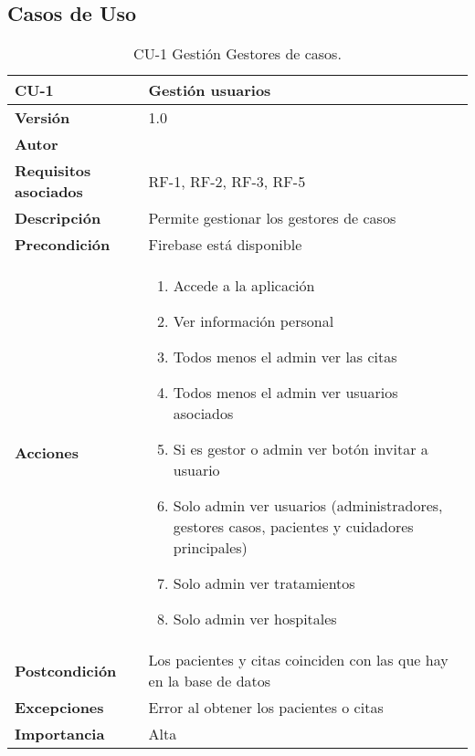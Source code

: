 \subsection{Casos de Uso}
\begin{table}[p]
	\centering
	\begin{tabularx}{\linewidth}{ p{} p{} }
		\toprule
		\textbf{CU-1}    & \textbf{Gestión usuarios}\\
		\toprule
		\textbf{Versión}              & 1.0    \\
		\textbf{Autor}                & {\nombre}\\
		\textbf{Requisitos asociados} & RF-1, RF-2, RF-3, RF-5\\
		\textbf{Descripción}          & Permite gestionar los gestores de casos \\
		\textbf{Precondición}         & Firebase está disponible \\
		\textbf{Acciones}             &
		\begin{enumerate}
			\def\labelenumi{\arabic{enumi}.}
			\tightlist
			\item Accede a la aplicación
			\item Ver información personal
			\item Todos menos el admin ver las citas
			\item Todos menos el admin ver usuarios asociados
			\item Si es gestor o admin ver botón invitar a usuario
			\item Solo admin ver usuarios (administradores, gestores casos, pacientes y cuidadores principales)
			\item Solo admin ver tratamientos
			\item Solo admin ver hospitales
		\end{enumerate}\\
		\textbf{Postcondición}        & Los pacientes y citas coinciden con las que hay en la base de datos \\
		\textbf{Excepciones}          & Error al obtener los pacientes o citas \\
		\textbf{Importancia}          & Alta \\
		\bottomrule
	\end{tabularx}
	\caption{CU-1 Gestión Gestores de casos.}
\end{table}

